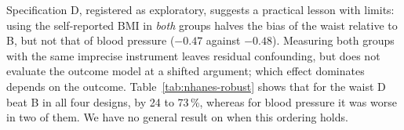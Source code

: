 Specification D, registered as exploratory, suggests a practical lesson with limits: using the self-reported BMI in \emph{both} groups halves the bias of the waist relative to B, but not that of blood pressure ($-0.47$ against $-0.48$). Measuring both groups with the same imprecise instrument leaves residual confounding, but does not evaluate the outcome model at a shifted argument; which effect dominates depends on the outcome. Table~\ref{tab:nhanes-robust} shows that for the waist D beat B in all four designs, by 24 to 73\,\%, whereas for blood pressure it was worse in two of them. We have no general result on when this ordering holds.

\begin{table}[ht]
\centering
\caption{NHANES, robustness (200 replications each). Mean bias of the DR estimator in the waist (cm) and, in the last two columns, in blood pressure (BP); in parentheses, the registered prediction.}\label{tab:nhanes-robust}
\end{table}

